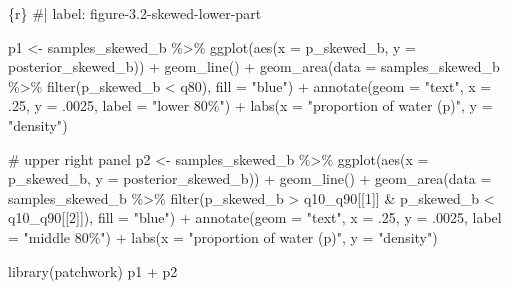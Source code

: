 \documentclass[
  letterpaper,
  DIV=11,
  numbers=noendperiod]{scrreprt}
\newenvironment{Shaded}{\begin{snugshade}}{\end{snugshade}}
\newcommand{\AttributeTok}[1]{\textcolor[rgb]{0.40,0.45,0.13}{#1}}
\newcommand{\CommentTok}[1]{\textcolor[rgb]{0.37,0.37,0.37}{#1}}
\newcommand{\DecValTok}[1]{\textcolor[rgb]{0.68,0.00,0.00}{#1}}
\newcommand{\FunctionTok}[1]{\textcolor[rgb]{0.28,0.35,0.67}{#1}}
\newcommand{\InformationTok}[1]{\textcolor[rgb]{0.37,0.37,0.37}{#1}}
\newcommand{\NormalTok}[1]{\textcolor[rgb]{0.00,0.23,0.31}{#1}}
\newcommand{\OtherTok}[1]{\textcolor[rgb]{0.00,0.23,0.31}{#1}}
\newcommand{\SpecialCharTok}[1]{\textcolor[rgb]{0.37,0.37,0.37}{#1}}
\newcommand{\StringTok}[1]{\textcolor[rgb]{0.13,0.47,0.30}{#1}}
\begin{document}
\begin{Shaded}
\begin{Highlighting}[]
\InformationTok{\textasciigrave{}\textasciigrave{}\textasciigrave{}\{r\}}
\CommentTok{\#| label: figure{-}3.2{-}skewed{-}lower{-}part}

\NormalTok{p1 }\OtherTok{\textless{}{-}}
\NormalTok{  samples\_skewed\_b }\SpecialCharTok{\%\textgreater{}\%} 
  \FunctionTok{ggplot}\NormalTok{(}\FunctionTok{aes}\NormalTok{(}\AttributeTok{x =}\NormalTok{ p\_skewed\_b, }\AttributeTok{y =}\NormalTok{ posterior\_skewed\_b)) }\SpecialCharTok{+}
  \FunctionTok{geom\_line}\NormalTok{() }\SpecialCharTok{+}
  \FunctionTok{geom\_area}\NormalTok{(}\AttributeTok{data =}\NormalTok{ samples\_skewed\_b }\SpecialCharTok{\%\textgreater{}\%} \FunctionTok{filter}\NormalTok{(p\_skewed\_b }\SpecialCharTok{\textless{}}\NormalTok{ q80), }\AttributeTok{fill =} \StringTok{"blue"}\NormalTok{) }\SpecialCharTok{+}
  \FunctionTok{annotate}\NormalTok{(}\AttributeTok{geom =} \StringTok{"text"}\NormalTok{,}
           \AttributeTok{x =}\NormalTok{ .}\DecValTok{25}\NormalTok{, }\AttributeTok{y =}\NormalTok{ .}\DecValTok{0025}\NormalTok{,}
           \AttributeTok{label =} \StringTok{"lower 80\%"}\NormalTok{) }\SpecialCharTok{+}
  \FunctionTok{labs}\NormalTok{(}\AttributeTok{x =} \StringTok{"proportion of water (p)"}\NormalTok{,}
       \AttributeTok{y =} \StringTok{"density"}\NormalTok{)}

\CommentTok{\# upper right panel}
\NormalTok{p2 }\OtherTok{\textless{}{-}} 
\NormalTok{  samples\_skewed\_b }\SpecialCharTok{\%\textgreater{}\%} 
  \FunctionTok{ggplot}\NormalTok{(}\FunctionTok{aes}\NormalTok{(}\AttributeTok{x =}\NormalTok{ p\_skewed\_b, }\AttributeTok{y =}\NormalTok{ posterior\_skewed\_b)) }\SpecialCharTok{+}
  \FunctionTok{geom\_line}\NormalTok{() }\SpecialCharTok{+}
  \FunctionTok{geom\_area}\NormalTok{(}\AttributeTok{data =}\NormalTok{ samples\_skewed\_b }\SpecialCharTok{\%\textgreater{}\%} \FunctionTok{filter}\NormalTok{(p\_skewed\_b }\SpecialCharTok{\textgreater{}}\NormalTok{ q10\_q90[[}\DecValTok{1}\NormalTok{]] }\SpecialCharTok{\&}\NormalTok{ p\_skewed\_b }\SpecialCharTok{\textless{}}\NormalTok{ q10\_q90[[}\DecValTok{2}\NormalTok{]]), }\AttributeTok{fill =} \StringTok{"blue"}\NormalTok{) }\SpecialCharTok{+}
  \FunctionTok{annotate}\NormalTok{(}\AttributeTok{geom =} \StringTok{"text"}\NormalTok{,}
           \AttributeTok{x =}\NormalTok{ .}\DecValTok{25}\NormalTok{, }\AttributeTok{y =}\NormalTok{ .}\DecValTok{0025}\NormalTok{,}
           \AttributeTok{label =} \StringTok{"middle 80\%"}\NormalTok{) }\SpecialCharTok{+}
  \FunctionTok{labs}\NormalTok{(}\AttributeTok{x =} \StringTok{"proportion of water (p)"}\NormalTok{,}
       \AttributeTok{y =} \StringTok{"density"}\NormalTok{)}

\FunctionTok{library}\NormalTok{(patchwork)}
\NormalTok{p1 }\SpecialCharTok{+}\NormalTok{ p2}
\InformationTok{\textasciigrave{}\textasciigrave{}\textasciigrave{}}
\end{Highlighting}
\end{Shaded}
\end{document}

